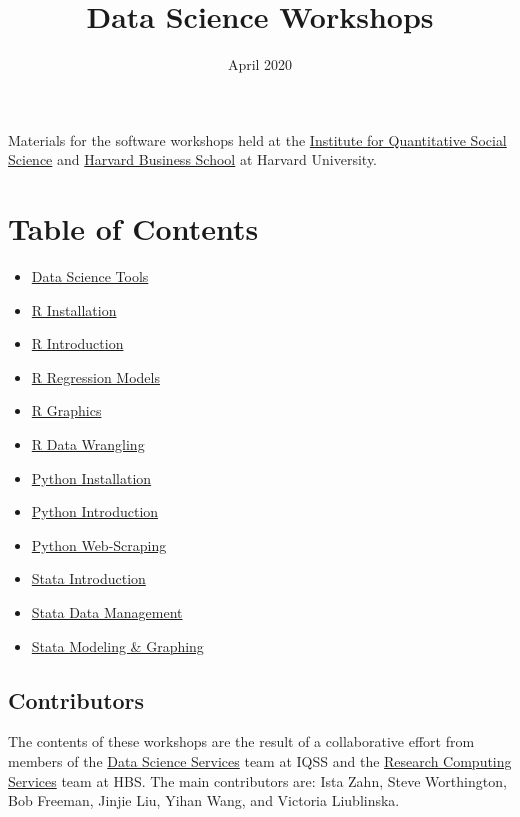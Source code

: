 \documentclass[]{book}
\title{Data Science Workshops}
\author{}
\date{\vspace{-2.5em}April 2020}
\providecommand{\tightlist}{%
  \setlength{\itemsep}{0pt}\setlength{\parskip}{0pt}}
\begin{document}
\maketitle

{
\setcounter{tocdepth}{1}
\tableofcontents
}
Materials for the software workshops held at the \href{http://dss.iq.harvard.edu/}{Institute for Quantitative Social Science} and \href{https://training.rcs.hbs.org}{Harvard Business School} at Harvard University.

\hypertarget{table-of-contents}{%
\chapter*{Table of Contents}\label{table-of-contents}}

\begin{itemize}
\tightlist
\item
  \href{./DataScienceTools.html}{Data Science Tools}
\item
  \href{./Rinstall.html}{R Installation}
\item
  \href{./Rintro.html}{R Introduction}
\item
  \href{./Rmodels.html}{R Regression Models}
\item
  \href{./Rgraphics.html}{R Graphics}
\item
  \href{./RDataWrangling.html}{R Data Wrangling}
\item
  \href{./PythonInstall.html}{Python Installation}
\item
  \href{./PythonIntro.html}{Python Introduction}
\item
  \href{./PythonWebScrape.html}{Python Web-Scraping}
\item
  \href{./StataIntro.html}{Stata Introduction}
\item
  \href{./StataDatMan.html}{Stata Data Management}
\item
  \href{./StataModGraph.html}{Stata Modeling \& Graphing}
\end{itemize}

\hypertarget{contributors}{%
\section*{Contributors}\label{contributors}}

The contents of these workshops are the result of a collaborative effort from members of the \href{http://dss.iq.harvard.edu}{Data Science Services} team at IQSS and the \href{https://training.rcs.hbs.org}{Research Computing Services} team at HBS. The main contributors are: Ista Zahn, Steve Worthington, Bob Freeman, Jinjie Liu, Yihan Wang, and Victoria Liublinska.
\end{document}
